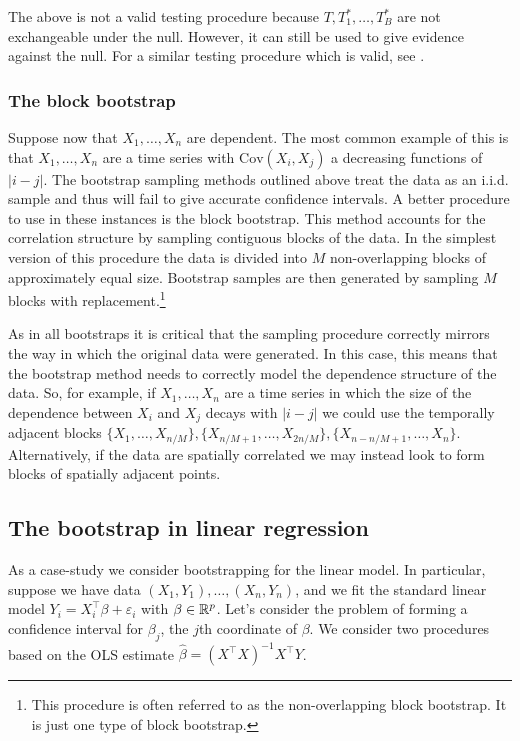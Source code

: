 The above is not a valid testing procedure because $T,T_1^*,\ldots,T_B^*$ are not exchangeable under the null. However, it can still be used to give evidence against the null. For a similar testing procedure which is valid, see \cite{BarberGoF}.

\subsubsection*{The block bootstrap}

Suppose now that $X_1,\dots,X_n$ are dependent. The most common example of this is that $X_1,\dots,X_n$ are a time series with $\text{Cov}(X_i,X_j)$ a decreasing functions of $|i-j|$. The bootstrap sampling methods outlined above treat the data as an i.i.d. sample and thus will fail to give accurate confidence intervals. A better procedure to use in these instances is the block bootstrap. This method accounts for the correlation structure by sampling contiguous blocks of the data. In the simplest version of this procedure the data is divided into $M$ non-overlapping blocks of approximately equal size. Bootstrap samples are then generated by sampling $M$ blocks with replacement.\footnote{ This procedure is often referred to as the non-overlapping block bootstrap. It is just one type of block bootstrap.}  

As in all bootstraps it is critical that the sampling procedure correctly mirrors the way in which the original data were generated. In this case, this means that the bootstrap method needs to correctly model the dependence structure of the data. So, for example, if $X_1,\dots,X_n$ are a time series in which the size of the dependence between $X_i$ and $X_j$ decays with $|i-j|$ we could use the temporally adjacent blocks $\{X_1,\dots,X_{n/M}\},\{X_{n/M+1},\dots,X_{2n/M}\},\{X_{n-n/M+1},\dots,X_n\}$. Alternatively, if the data are spatially correlated we may instead look to form blocks of spatially adjacent points. 

\subsection{The bootstrap in linear regression}

As a case-study we consider bootstrapping for the linear model. In particular, suppose we have data $(X_1,Y_1),\dots,(X_n,Y_n)$, and we fit the standard linear model $Y_i = X_i^\top\beta + \varepsilon_i$ with $\beta \in \mathbb{R}^p$. Let's consider the problem of forming a confidence interval for $\beta_j$, the $j$th coordinate of $\beta$. We consider two procedures based on the OLS estimate $\hat{\beta} = (X^\top X)^{-1}X^\top Y$.


